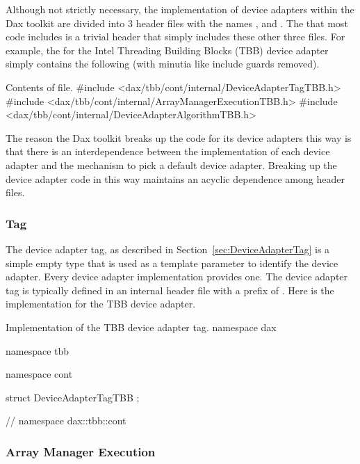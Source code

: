 Although not strictly necessary, the implementation of device adapters
within the Dax toolkit are divided into 3 header files with the names
,
 and
. The
 that most code includes
is a trivial header that simply includes these other three files. For
example, the  for the Intel
Threading Building Blocks (TBB) device adapter simply contains the
following (with minutia like include guards removed).

\begin{daxexample}{Contents of \protect{} file.}
#include <dax/tbb/cont/internal/DeviceAdapterTagTBB.h>
#include <dax/tbb/cont/internal/ArrayManagerExecutionTBB.h>
#include <dax/tbb/cont/internal/DeviceAdapterAlgorithmTBB.h>
\end{daxexample}

The reason the Dax toolkit breaks up the code for its device adapters this
way is that there is an interdependence between the implementation of each
device adapter and the mechanism to pick a default device adapter. Breaking
up the device adapter code in this way maintains an acyclic dependence among
header files.

\subsubsection{Tag}

The device adapter tag, as described in Section~\ref{sec:DeviceAdapterTag}
is a simple empty type that is used as a template parameter to identify the
device adapter. Every device adapter implementation provides one. The
device adapter tag is typically defined in an internal header file with a
prefix of . Here is the implementation for
the TBB device adapter.

\begin{daxexample}{Implementation of the TBB device adapter tag.}
namespace dax {
namespace tbb {
namespace cont {

struct DeviceAdapterTagTBB {  };

}
}
} // namespace dax::tbb::cont
\end{daxexample}

\subsubsection{Array Manager Execution}

